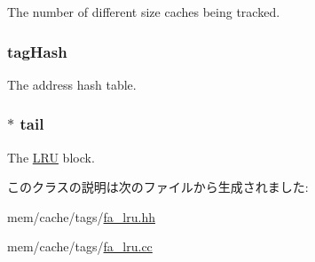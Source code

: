 \label{classFALRU_ae8d599d08408b7259ec22ce188c8a936}
The number of different size caches being tracked. \hypertarget{classFALRU_a89874e6ace0517ea2a50bae25cbbbf83}{
\subsubsection[{tagHash}]{ {\bf tagHash}}}
\label{classFALRU_a89874e6ace0517ea2a50bae25cbbbf83}
The address hash table. \hypertarget{classFALRU_ac959b56dd2bb57a61f6869516a31460d}{
\subsubsection[{tail}]{$\ast$ {\bf tail}}}
\label{classFALRU_ac959b56dd2bb57a61f6869516a31460d}
The \hyperlink{classLRU}{LRU} block. 

このクラスの説明は次のファイルから生成されました:\begin{DoxyCompactItemize}
\item 
mem/cache/tags/\hyperlink{fa__lru_8hh}{fa\_\-lru.hh}\item 
mem/cache/tags/\hyperlink{fa__lru_8cc}{fa\_\-lru.cc}\end{DoxyCompactItemize}
